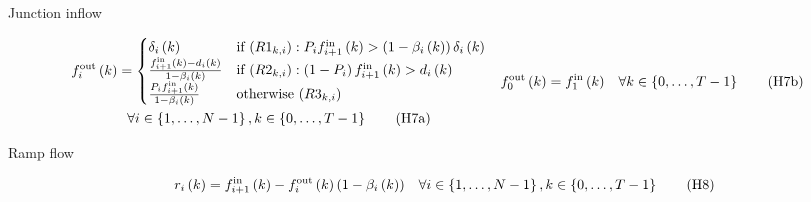\documentclass[xcolor=svgnames, english, smaller]{beamer}
\theoremstyle{plain}
\theoremstyle{definition}
\theoremstyle{plain}
\theoremstyle{plain}
\newcommand \Fontvi{\fontsize{8}{8}\selectfont}
\newcommand \systemDiagOffset{-1.8in}
\newcommand \systemDiagResizeMult{1.3}
\begin{document}
\begin{frame}{Junction inflow}

\Fontvi

\begin{figure}[t]
\hspace{\systemDiagOffset}
\resizebox{\systemDiagResizeMult\columnwidth}{!}{}
\label{fig:system}
\end{figure}

\begin{subequations}
\begin{multline}
\flowout{\icell}{\itime}
=\begin{cases}
\celldemand{\icell}{\itime} 
& \text{if } (\R{1}{\itime}{\icell}) : \priority{\icell}\flowin{\icell+1}{\itime} > \left(1-\offrampratio{\icell}{\itime}\right)\celldemand{\icell}{\itime}
\\
\frac{\flowin{\icell+1}{\itime}-\rampdemand{\icell}{\itime}}{1-\offrampratio{\icell}{\itime}}
& \text{if } (\R{2}{\itime}{\icell}) : \left(1-\priority{\icell}\right)\flowin{\icell+1}{\itime} > \rampdemand{\icell}{\itime}
\\
\frac{\priority{\icell}\flowin{\icell+1}{\itime}}{1-\offrampratio{\icell}{\itime}} & \text{otherwise } (\R{3}{\itime}{\icell})
\end{cases} \\
\forall\icell\in\left\{ 1,\ldots,\ncell-1\right\} ,\itime\in\left\{ 0,\ldots,\ntime-1\right\}
\tag{H7a}
\label{eq:junctionPriority}
\end{multline}
\begin{align}
&& \flowout{0}{\itime} & =\flowin{1}{\itime} &
\forall \itime \in \left \{ 0, \dots, \ntime-1 \right\}
\tag{H7b}
\label{eq:junctionFlowConservationSpecial1}	
\end{align}
\end{subequations}

\end{frame}
\begin{frame}{Ramp flow}

\Fontvi

\begin{figure}[t]
\hspace{\systemDiagOffset}
\resizebox{\systemDiagResizeMult\columnwidth}{!}{}
\label{fig:system}
\end{figure}

\begin{align}
&& r_{i}\left(k\right) & = f_{i+1}^{\text{in}}\left(k\right) - f_{i}^{\text{out}}\left(k\right)\left(1-\beta_{i}\left(k\right)\right)& \forall i\in\left\{ 1,\ldots,N-1\right\} ,k\in\left\{ 0,\ldots,T-1\right\}
\tag{H8}
\label{eq:junctionFlowConservation}
\end{align}

\end{frame}
\end{document}

